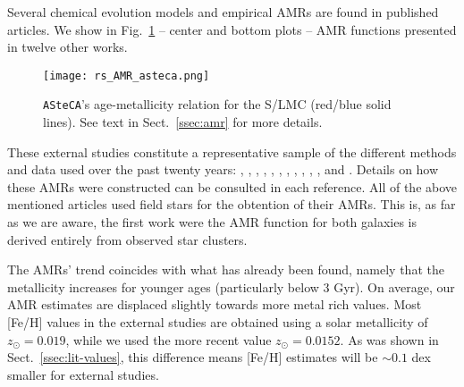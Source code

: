 \documentclass{aa}
\begin{document}
Several chemical evolution models and empirical AMRs are found in published
articles.
We show in Fig.~\ref{fig:amr} -- center and bottom plots -- AMR functions
presented in twelve other works.
%
\begin{figure}
\centering
\texttt{[image: rs\_AMR\_asteca.png]}
\caption{\texttt{ASteCA}'s age-metallicity relation for the S/LMC (red/blue
solid lines). See text in Sect.~\ref{ssec:amr} for more details.}
\label{fig:amr}
\end{figure}
%
These external studies constitute a representative sample of the different
methods and data used over the past twenty years:
\citet[][PT98; bursting models]{Pagel_1998}, \citet[][G98; closed-box model
with Holtzman SFH]{Geha_1998}, \citet[][HZ04]{Harris_2004}, \citet[][C08a;
average of four disk frames]{Carrera_2008_lmc}, \citet[][C08b; average of
thirteen frames]{Carrera_2008_smc}, \citet[][HZ09]{Harris_2009}, \citet[][N09;
5th degree polynomial fit to the AMRs of their three observed regions]
{Noel_2009}, \citet[][TB09; 1: no merger model, 2: equal mass merger, 3: one
to four merger]{Tsujimoto_2009}, \citet[][R12; four tiles average]{Rubele_2012},
\citet[][C13; B: Bologna, C: Cole]{Cignoni_2013}, \citet[][PG13]
{Piatti_Geisler_2013}, and \citet[][M14; 0: field LMC0, 1: field LMC1, 2: field
LMC2]{Meschin_2014}.
Details on how these AMRs were constructed can be consulted in each reference.
%
All of the above mentioned articles used field stars for the obtention
of their AMRs. This is, as far as we are aware, the first work were the AMR
function for both galaxies is derived entirely from observed star clusters.


The AMRs' trend coincides with what has already been found, namely that the
metallicity increases for younger ages (particularly below 3 Gyr). On average,
our AMR estimates are displaced slightly towards more metal rich values.
Most [Fe/H] values in the external studies are obtained using a solar
metallicity of $z_{\odot}{=}0.019$, while we used the more recent value
$z_{\odot}{=}0.0152$. As was shown in Sect.~\ref{ssec:lit-values}, this
difference means [Fe/H] estimates will be ${\sim}0.1$ dex smaller for external
studies.
\end{document}
